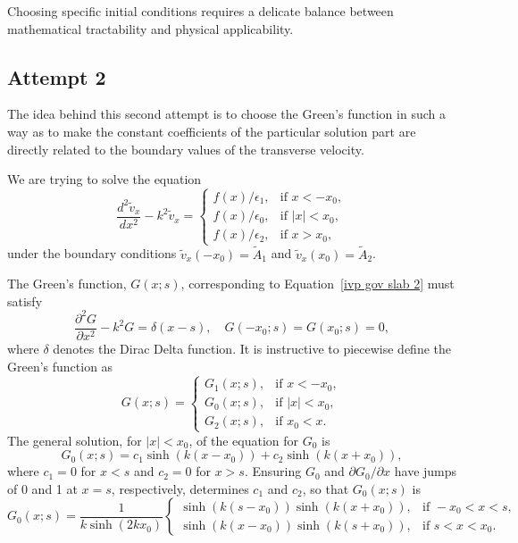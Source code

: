 \documentclass{aastex61}
\begin{document}
Choosing specific initial conditions requires a delicate balance between mathematical tractability and physical applicability. 
















\subsection{Attempt 2}

The idea behind this second attempt is to choose the Green's function in such a way as to make the constant coefficients of the particular solution part are directly related to the boundary values of the transverse velocity.

We are trying to solve the equation
\begin{equation}
\frac{d^2\tilde{v}_x}{dx^2} - k^2\tilde{v}_x = 
\begin{cases}
f(x)/\epsilon_1, & \text{if  } x<-x_0,\\
f(x)/\epsilon_0, & \text{if  } |x|<x_0,\\
f(x)/\epsilon_2, & \text{if  } x>x_0,
\end{cases}
\label{ivp gov slab 2}
\end{equation}
under the boundary conditions $\tilde{v}_x(-x_0) = \tilde{A}_1$ and $\tilde{v}_x(x_0) = \tilde{A}_2$.

The Green's function, $G(x;s)$, corresponding to Equation~\eqref{ivp gov slab 2} must satisfy 
\begin{equation}
\frac{\partial^2G}{\partial x^2} - k^2 G = \delta(x-s), \quad G(-x_0;s) = G(x_0;s) = 0,
\end{equation}
where $\delta$ denotes the Dirac Delta function. It is instructive to piecewise define the Green's function as
\begin{equation}
G(x;s) = 
\begin{cases}
G_1(x;s), & \text{if } x < -x_0, \\
G_0(x;s), & \text{if } |x| < x_0, \\
G_2(x;s), & \text{if } x_0 < x.
\end{cases}
\end{equation}
The general solution, for $|x| < x_0$, of the equation for $G_0$ is
\begin{equation}
G_0(x;s) = c_1\sinh(k(x - x_0)) + c_2\sinh(k(x + x_0)),
\end{equation}
where $c_1 = 0$ for $x < s$ and $c_2 = 0$ for $x > s$. Ensuring $G_0$ and $\partial G_0 / \partial x$ have jumps of 0 and 1 at $x = s$, respectively, determines $c_1$ and $c_2$, so that $G_0(x;s)$ is
\begin{equation}
G_0(x;s) = \frac{1}{k\sinh(2k x_0)}
\begin{cases}
\sinh(k(s - x_0))\sinh(k(x + x_0)), & \text{if } -x_0<x<s, \\
\sinh(k(x - x_0))\sinh(k(s + x_0)), & \text{if } s<x<x_0.
\end{cases}
\end{equation}
\end{document}

